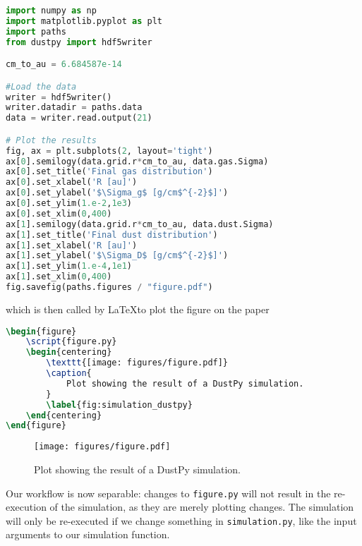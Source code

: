 \documentclass{aa}
\begin{document}
\begin{lstlisting}[language=python, caption=figure.py]
import numpy as np
import matplotlib.pyplot as plt
import paths
from dustpy import hdf5writer

cm_to_au = 6.684587e-14

#Load the data
writer = hdf5writer()
writer.datadir = paths.data
data = writer.read.output(21)

# Plot the results
fig, ax = plt.subplots(2, layout='tight')
ax[0].semilogy(data.grid.r*cm_to_au, data.gas.Sigma)
ax[0].set_title('Final gas distribution')
ax[0].set_xlabel('R [au]')
ax[0].set_ylabel('$\Sigma_g$ [g/cm$^{-2}$]')
ax[0].set_ylim(1.e-2,1e3)
ax[0].set_xlim(0,400)
ax[1].semilogy(data.grid.r*cm_to_au, data.dust.Sigma)
ax[1].set_title('Final dust distribution')
ax[1].set_xlabel('R [au]')
ax[1].set_ylabel('$\Sigma_D$ [g/cm$^{-2}$]')
ax[1].set_ylim(1.e-4,1e1)
ax[1].set_xlim(0,400)
fig.savefig(paths.figures / "figure.pdf")
\end{lstlisting}

which is then called by \LaTeX to plot the figure on the paper

\begin{lstlisting}[language=TeX]
\begin{figure}
    \script{figure.py}
    \begin{centering}
        \texttt{[image: figures/figure.pdf]}
        \caption{
            Plot showing the result of a DustPy simulation.
        }
        \label{fig:simulation_dustpy}
    \end{centering}
\end{figure}
\end{lstlisting}

\begin{figure}
    \begin{centering}
        \texttt{[image: figures/figure.pdf]}
        \caption{
            Plot showing the result of a DustPy simulation.
        }
        \label{fig:simulation_dustpy}
    \end{centering}
\end{figure}

Our workflow is now separable: changes to \texttt{figure.py} will not result in the re-execution of the simulation, as they are merely plotting changes.
The simulation will only be re-executed if we change something in \texttt{simulation.py}, like the input arguments to our simulation function.
\end{document}
